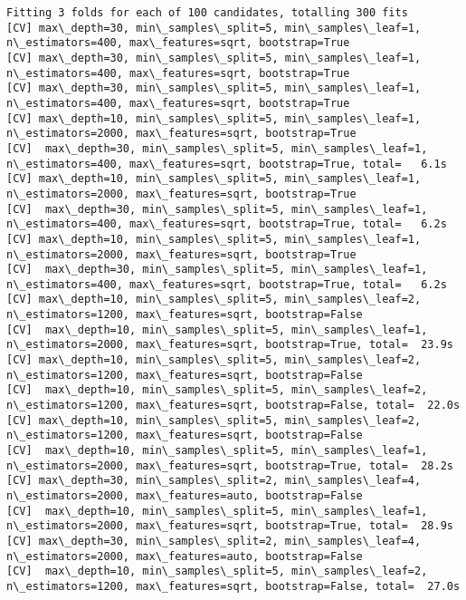 \documentclass[11pt]{article}
\begin{document}
    \begin{Verbatim}[commandchars=\\\{\}]
Fitting 3 folds for each of 100 candidates, totalling 300 fits
[CV] max\_depth=30, min\_samples\_split=5, min\_samples\_leaf=1, n\_estimators=400, max\_features=sqrt, bootstrap=True 
[CV] max\_depth=30, min\_samples\_split=5, min\_samples\_leaf=1, n\_estimators=400, max\_features=sqrt, bootstrap=True 
[CV] max\_depth=30, min\_samples\_split=5, min\_samples\_leaf=1, n\_estimators=400, max\_features=sqrt, bootstrap=True 
[CV] max\_depth=10, min\_samples\_split=5, min\_samples\_leaf=1, n\_estimators=2000, max\_features=sqrt, bootstrap=True 
[CV]  max\_depth=30, min\_samples\_split=5, min\_samples\_leaf=1, n\_estimators=400, max\_features=sqrt, bootstrap=True, total=   6.1s
[CV] max\_depth=10, min\_samples\_split=5, min\_samples\_leaf=1, n\_estimators=2000, max\_features=sqrt, bootstrap=True 
[CV]  max\_depth=30, min\_samples\_split=5, min\_samples\_leaf=1, n\_estimators=400, max\_features=sqrt, bootstrap=True, total=   6.2s
[CV] max\_depth=10, min\_samples\_split=5, min\_samples\_leaf=1, n\_estimators=2000, max\_features=sqrt, bootstrap=True 
[CV]  max\_depth=30, min\_samples\_split=5, min\_samples\_leaf=1, n\_estimators=400, max\_features=sqrt, bootstrap=True, total=   6.2s
[CV] max\_depth=10, min\_samples\_split=5, min\_samples\_leaf=2, n\_estimators=1200, max\_features=sqrt, bootstrap=False 
[CV]  max\_depth=10, min\_samples\_split=5, min\_samples\_leaf=1, n\_estimators=2000, max\_features=sqrt, bootstrap=True, total=  23.9s
[CV] max\_depth=10, min\_samples\_split=5, min\_samples\_leaf=2, n\_estimators=1200, max\_features=sqrt, bootstrap=False 
[CV]  max\_depth=10, min\_samples\_split=5, min\_samples\_leaf=2, n\_estimators=1200, max\_features=sqrt, bootstrap=False, total=  22.0s
[CV] max\_depth=10, min\_samples\_split=5, min\_samples\_leaf=2, n\_estimators=1200, max\_features=sqrt, bootstrap=False 
[CV]  max\_depth=10, min\_samples\_split=5, min\_samples\_leaf=1, n\_estimators=2000, max\_features=sqrt, bootstrap=True, total=  28.2s
[CV] max\_depth=30, min\_samples\_split=2, min\_samples\_leaf=4, n\_estimators=2000, max\_features=auto, bootstrap=False 
[CV]  max\_depth=10, min\_samples\_split=5, min\_samples\_leaf=1, n\_estimators=2000, max\_features=sqrt, bootstrap=True, total=  28.9s
[CV] max\_depth=30, min\_samples\_split=2, min\_samples\_leaf=4, n\_estimators=2000, max\_features=auto, bootstrap=False 
[CV]  max\_depth=10, min\_samples\_split=5, min\_samples\_leaf=2, n\_estimators=1200, max\_features=sqrt, bootstrap=False, total=  27.0s

\end{Verbatim}
\end{document}
